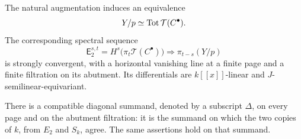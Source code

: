 \begin{proposition}
\label{prop:descent-test}
The natural augmentation induces an equivalence
\begin{equation}\label{eq:tested-totalization}
  Y/p\simeq\operatorname{Tot}\mathcal T(C^\bullet).
\end{equation}
The corresponding spectral sequence
\begin{equation}\label{eq:tested-spectral-sequence}
  \mathsf E_2^{s,t}
     =H^s\bigl(\pi_t\mathcal T(C^\bullet)\bigr)
       \Longrightarrow\pi_{t-s}(Y/p)
\end{equation}
is strongly convergent, with a horizontal vanishing line at a finite
page and a finite filtration on its abutment.  Its differentials are
$k[[x]]$-linear and $J$-semilinear-equivariant.

There is a compatible diagonal summand, denoted by a subscript
$\Delta$, on every page and on the abutment filtration: it is the
summand on which the two copies of $k$, from $E_2$ and $S_k$, agree.
The same assertions hold on that summand.
\end{proposition}


